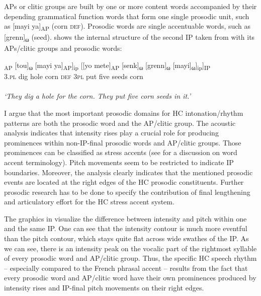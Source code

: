 \documentclass[output=paper]{langsci/langscibook}
\begin{document}
APs or clitic groups are built by one or more content words accompanied by their depending grammatical function words that form one single prosodic unit, such as [mayi ya]\textsubscript{AP} (corn \textsc{def}). Prosodic words are single accentuable words, such as [grenn]\textsubscript{ω} (seed).  shows the internal structure of the second IP taken from  with its APs/clitic groups and prosodic words:

\ea \label{ex:kal:2}
\gll [[[yo                       fouye]\textsubscript{AP} [tou]\textsubscript{ω} [mayi             ya]\textsubscript{AP}]\textsubscript{ip} [[yo  mete]\textsubscript{AP} [senk]\textsubscript{ω} [grenn]\textsubscript{ω} [mayi]\textsubscript{ω}]\textsubscript{ip}]\textsubscript{IP} 
\\
{\db}{\db}{\db}3.\textsc{pl}     dig                      {\db}hole          {\db}corn    \textsc{def}                    {\db}{\db}3\textsc{pl}  put                {\db}five                 {\db}seeds               {\db}corn
\\
\\
\textit{‘They dig a hole for the corn. They put five corn seeds in it.’}
\z

I argue that the most important prosodic domains for HC intonation/rhythm patterns are both the prosodic word and the AP/clitic group. The acoustic analysis indicates that intensity rises play a crucial role for producing prominences within non-IP-final prosodic words and AP/clitic groups. Those prominences can be classified as stress accents (see \citealt[3-53]{Hulstetal2010} for a discussion on word accent terminology). Pitch movements seem to be restricted to indicate IP boundaries. Moreover, the analysis clearly indicates that the mentioned prosodic events are located at the right edges of the HC prosodic constituents. Further prosodic research has to be done to specify the contribution of final lengthening and articulatory effort for the HC stress accent system.

The graphics in  visualize the difference between intensity and pitch within one and the same IP. One can see that the intensity contour is much more eventful than the pitch contour, which stays quite flat across wide swathes of the IP. As we can see, there is an intensity peak on the vocalic part of the rightmost syllable of every prosodic word and AP/clitic group. Thus, the specific HC speech rhythm – especially compared to the French phrasal accent – results from the fact that every prosodic word and AP/clitic word have their own prominences produced by intensity rises and IP-final pitch movements on their right edges. 
\end{document}
